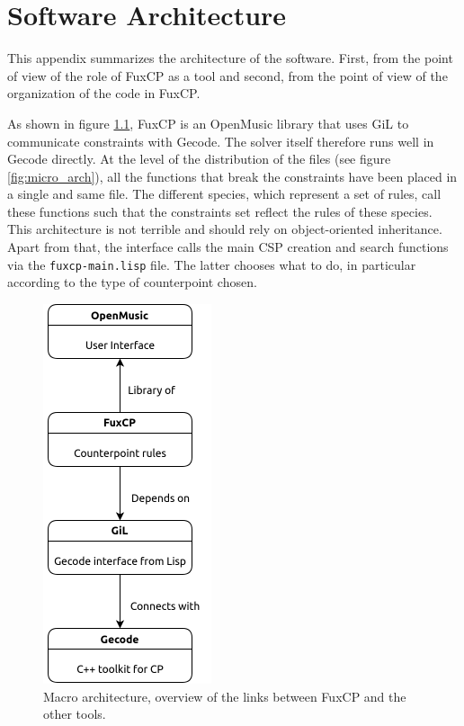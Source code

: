 \chapter{Software Architecture}\label{ch:software_arch}
This appendix summarizes the architecture of the software. First, from the point of view of the role of FuxCP as a tool and second, from the point of view of the organization of the code in FuxCP.

As shown in figure \ref{fig:macro_arch}, FuxCP is an OpenMusic library that uses GiL to communicate constraints with Gecode. The solver itself therefore runs well in Gecode directly. At the level of the distribution of the files (see figure \ref{fig:micro_arch}), all the functions that break the constraints have been placed in a single and same file. The different species, which represent a set of rules, call these functions such that the constraints set reflect the rules of these species. This architecture is not terrible and should rely on object-oriented inheritance. Apart from that, the interface calls the main CSP creation and search functions via the \texttt{fuxcp-main.lisp} file. The latter chooses what to do, in particular according to the type of counterpoint chosen.
\begin{figure}[h]
  \includegraphics[height=4.4in, center]{Images/macro_arch.png}
  \caption{Macro architecture, overview of the links between FuxCP and the other tools.}
  \label{fig:macro_arch}
\end{figure}
